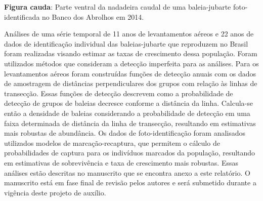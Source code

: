 \textbf{Figura cauda}: Parte ventral da nadadeira caudal de uma baleia-jubarte foto-identificada  no Banco dos Abrolhos em 2014.

Análises de uma série temporal de 11 anos de levantamentos aéreos e 22 anos de dados de identificação individual das baleias-jubarte que reproduzem no Brasil foram realizadas visando estimar as taxas de crescimento dessa população. Foram utilizados métodos que consideram a detecção imperfeita para as análises. Para os levantamentos aéreos foram construídas funções de detecção anuais com os dados de amostragem de distâncias perpendiculares dos grupos com relação às linhas de transecção. Essas funções de detecção descrevem como a probabilidade de detecção de grupos de baleias decresce conforme a distância da linha. Calcula-se então a densidade de baleias considerando a probabilidade de detecção em uma faixa determinada de distância da linha de transecção, resultando em estimativas mais robustas de abundância. Os dados de foto-identificação foram analisados utilizados modelos de marcação-recaptura, que permitem o cálculo de probabilidades de captura para os indivíduos marcados da população, resultando em estimativas de sobrevivência e taxa de crescimento mais robustas. Essas análises estão descritas no manuscrito que se encontra anexo a este relatório. O manuscrito está em fase final de revisão pelos autores e será submetido durante a vigência deste projeto de auxílio.